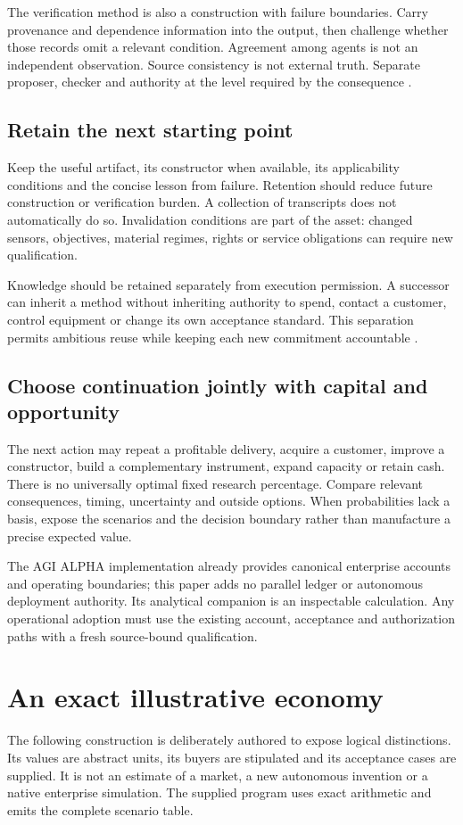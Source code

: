 \documentclass[11pt,letterpaper]{article}
\begin{document}
The verification method is also a construction with failure boundaries. Carry provenance and dependence information into the output, then challenge whether those records omit a relevant condition. Agreement among agents is not an independent observation. Source consistency is not external truth. Separate proposer, checker and authority at the level required by the consequence \cite{outreflect,enterprises,foundation}.

\subsection{Retain the next starting point}
Keep the useful artifact, its constructor when available, its applicability conditions and the concise lesson from failure. Retention should reduce future construction or verification burden. A collection of transcripts does not automatically do so. Invalidation conditions are part of the asset: changed sensors, objectives, material regimes, rights or service obligations can require new qualification.

Knowledge should be retained separately from execution permission. A successor can inherit a method without inheriting authority to spend, contact a customer, control equipment or change its own acceptance standard. This separation permits ambitious reuse while keeping each new commitment accountable \cite{enterprises,foundation}.

\subsection{Choose continuation jointly with capital and opportunity}
The next action may repeat a profitable delivery, acquire a customer, improve a constructor, build a complementary instrument, expand capacity or retain cash. There is no universally optimal fixed research percentage. Compare relevant consequences, timing, uncertainty and outside options. When probabilities lack a basis, expose the scenarios and the decision boundary rather than manufacture a precise expected value.

The AGI ALPHA implementation already provides canonical enterprise accounts and operating boundaries; this paper adds no parallel ledger or autonomous deployment authority. Its analytical companion is an inspectable calculation. Any operational adoption must use the existing account, acceptance and authorization paths with a fresh source-bound qualification.

\section{An exact illustrative economy}
\label{sec:example}
The following construction is deliberately authored to expose logical distinctions. Its values are abstract units, its buyers are stipulated and its acceptance cases are supplied. It is not an estimate of a market, a new autonomous invention or a native enterprise simulation. The supplied program uses exact arithmetic and emits the complete scenario table.
\end{document}
